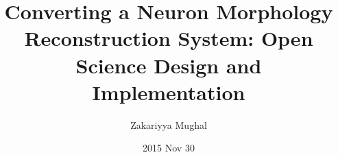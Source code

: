 \title[]{Converting a Neuron Morphology Reconstruction System: Open Science Design and Implementation}
\author[]{Zakariyya Mughal}
\date{2015 Nov 30}
